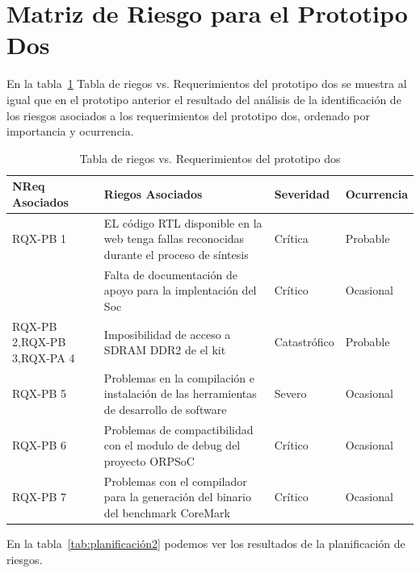 		\section{Matriz de Riesgo para el Prototipo Dos} 
En la tabla~\ref{tab:riegos2} Tabla de riegos vs. Requerimientos del prototipo dos se muestra al igual que en el prototipo anterior el resultado del análisis de la identificación de los riesgos asociados a los requerimientos del prototipo dos, ordenado por importancia y ocurrencia.
		\begin{table}[h!]
		\centering
		\begin{tabular}{ p{2.5cm} p{9cm} p{1.5cm} p{2cm} }
		\hline 
		\rowcolor[gray]{0.8} N\textordmasculine Req Asociados& Riegos Asociados & Severidad  & Ocurrencia \\
		\hline
		RQX-PB 1& EL código RTL disponible en la web tenga fallas reconocidas durante el proceso de síntesis & Crítica       & Probable \\
		\hline				
				& Falta de documentación de apoyo para la implentación
del Soc & Crítico & Ocasional\\	 
		\hline
		RQX-PB 2,RQX-PB 3,RQX-PA 4 & Imposibilidad de acceso a SDRAM DDR2 de el kit& Catastrófico & Probable\\
		\hline
		RQX-PB 5&Problemas en la compilación e instalación de las herramientas de desarrollo de software  & Severo  &  Ocasional\\ 
		\hline
		RQX-PB 6& Problemas de compactibilidad con el modulo de debug del proyecto ORPSoC  & Crítico&  Ocasional\\
		\hline
		RQX-PB 7 & Problemas con el compilador para la generación del binario del benchmark CoreMark  & Crítico&  Ocasional\\
		\hline
		\end{tabular}
		\caption{Tabla de riegos vs. Requerimientos del prototipo dos}
		\label{tab:riegos2}
		\end{table}

En la tabla~\ref{tab:planificación2} podemos ver los resultados de la planificación de riesgos.


